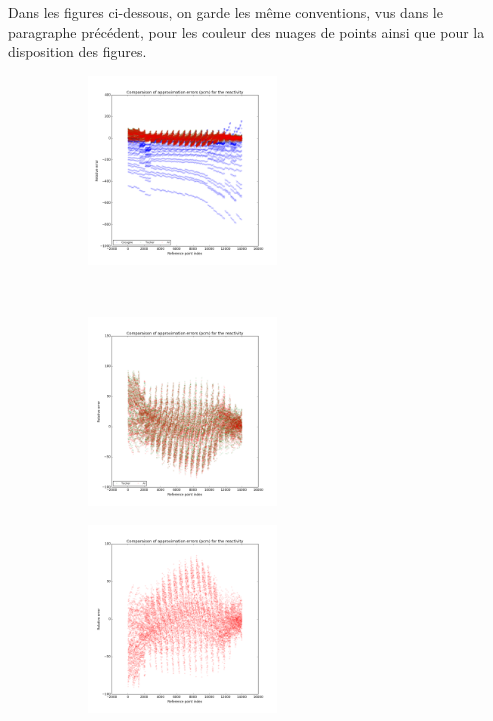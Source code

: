 Dans les figures ci-dessous, on garde les même conventions, vus dans le paragraphe précédent, pour les couleur des nuages de points ainsi que pour la disposition des figures.
\begin{center}
\begin{figure}[!h]\ContinuedFloat
		\centering
		\begin{subfigure}[b]{0.45\textwidth}
				\includegraphics[width=\linewidth,height=5cm]{images/MOX/ReactivityError_with_cocagne.png}
		\end{subfigure}
		~
		\begin{subfigure}[b]{0.45\textwidth}
				\includegraphics[width=\linewidth,height=5cm]{images/MOX/ReactivityError.png}
		\end{subfigure}
		\begin{subfigure}[b]{0.45\textwidth}
				\includegraphics[width=\linewidth,height=5cm]{images/MOX/ReactivityError_alone.png}
		\end{subfigure}
\end{figure}
\end{center}

